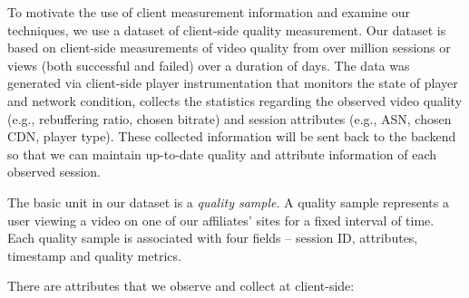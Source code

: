 \label{subsec:dataset}

 To motivate the use of client measurement information and examine our techniques, we use a dataset of client-side quality measurement. Our dataset is based on client-side measurements of video quality from over \fillme million sessions or views (both successful and failed) over a duration of \fillme days. The data was generated via client-side player instrumentation that monitors the state of player and network condition, collects the statistics regarding the observed video quality (e.g., rebuffering ratio, chosen bitrate) and session attributes (e.g., ASN, chosen CDN, player type). These collected information will be sent back to the backend so that we can maintain up-to-date quality and attribute information of each observed session.

 The basic unit in our dataset is a {\it quality sample}. A quality sample represents a user viewing a video on one of our affiliates' sites for a fixed interval of time. Each quality sample is associated with four fields -- session ID, attributes, timestamp and quality metrics. 

 There are \fillme attributes that we observe and collect at client-side:

